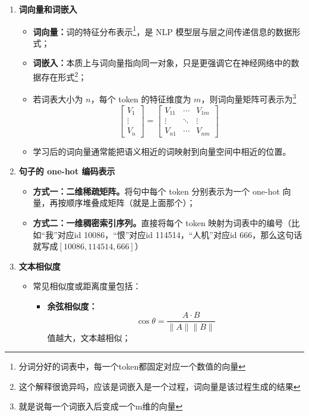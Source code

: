 \documentclass[../main.tex]{subfiles}
\begin{document}
\begin{enumerate}
    \item \textbf{词向量和词嵌入}
    \begin{itemize}
        \item \textbf{词向量：}词的特征分布表示\footnote{分词分好的词表中，每一个token都固定对应一个数值的向量}，是 NLP 模型层与层之间传递信息的数据形式；
        \item \textbf{词嵌入：}本质上与词向量指向同一对象，只是更强调它在神经网络中的数据存在形式\footnote{这个解释很诡异吗，应该是词嵌入是一个过程，词向量是该过程生成的结果}；
        \item 若词表大小为 $n$，每个 token 的特征维度为 $m$，则词向量矩阵可表示为\footnote{就是说每一个词嵌入后变成一个m维的向量}
        $$
        \begin{bmatrix}
        V_1\\
        \vdots\\
        V_n
        \end{bmatrix}
        =
        \begin{bmatrix}
        V_{11} & \cdots & V_{1m}\\
        \vdots & \ddots & \vdots\\
        V_{n1} & \cdots & V_{nm}
        \end{bmatrix}
        $$
        \item 学习后的词向量通常能把语义相近的词映射到向量空间中相近的位置。
    \end{itemize}

    \item \textbf{句子的 one-hot 编码表示}
    \begin{itemize}
        \item \textbf{方式一：二维稀疏矩阵。}将句中每个 token 分别表示为一个 one-hot 向量，再按顺序堆叠成矩阵（就是上面那个）；
        \item \textbf{方式二：一维稠密索引序列。}直接将每个 token 映射为词表中的编号（比如“我”对应id 10086，“恨”对应id 114514，“人机”对应id 666，那么这句话就写成$[10086,114514,666]$）
    \end{itemize}

    \item \textbf{文本相似度}
    \begin{itemize}
        \item 常见相似度或距离度量包括：
        \begin{itemize}
            \item \textbf{余弦相似度：}
            $$
            \cos \theta = \frac{A\cdot B}{\lVert A\rVert \lVert B\rVert}
            $$
            值越大，文本越相似；
            

\end{itemize}
\end{itemize}
\end{enumerate}
\end{document}
